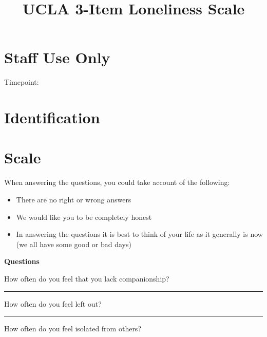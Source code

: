 \documentclass[
  english,
  a4paper,
  sdaps_style=qr,
  checkmode= check
]{sdapsclassic}
\title{UCLA 3-Item Loneliness Scale}
\author{}
\date{}
\begin{document}
\begin{questionnaire}[noinfo]

\section{Staff Use Only}
    \begin{optionquestion}[cols=3, var=timepoint]{Timepoint:}
    \end{optionquestion}

\section{Identification}

\section{Scale}
When answering the questions, you could take account of the following: 
\begin{itemize}
    \item There are no right or wrong answers
    \item We would like you to be completely honest
    \item In answering the questions it is best to think of your life as it generally is now \\(we all have some good or bad days)
\end{itemize}

\vspace{0.5em}

\textbf{Questions}
\begin{optionquestion}[cols=1, singlechoice, var=How_often_do_you_feel_that_you_lack_companionship]{How often do you feel that you lack companionship?}
\end{optionquestion}

\rule{\linewidth}{1pt}

\begin{optionquestion}[cols=1, singlechoice, var=How_often_do_you_feel_left_out]{How often do you feel left out?}
\end{optionquestion}

\rule{\linewidth}{1pt}

\begin{optionquestion}[cols=1, singlechoice, var=How_often_do_you_feel_isolated_from_others]{How often do you feel isolated from others?}
\end{optionquestion}
\end{questionnaire}
\end{document}
